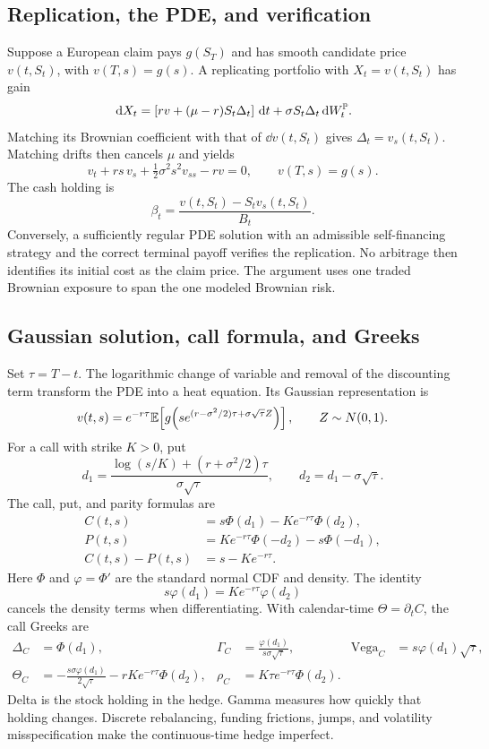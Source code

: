 \subsection{Replication, the PDE, and verification}

Suppose a European claim pays \(g(S_T)\) and has smooth candidate price
\(v(t,S_t)\), with \(v(T,s)=g(s)\). A replicating portfolio with
\(X_t=v(t,S_t)\) has gain
\[
\,\mathrm{d} X_t
=\left[rv+(\mu-r)S_t\Delta_t\right]\,\mathrm{d} t
+\sigma S_t\Delta_t\,\mathrm{d} W_t^{\mathbb{P}}.
\]
Matching its Brownian coefficient with that of \(\dd v(t,S_t)\) gives
\(\Delta_t=v_s(t,S_t)\). Matching drifts then cancels \(\mu\) and yields
\[
\boxed{
v_t+rs\,v_s+\tfrac12\sigma^2s^2v_{ss}-rv=0,
\qquad v(T,s)=g(s).}
\]
The cash holding is
\[
\boxed{\beta_t=\frac{v(t,S_t)-S_tv_s(t,S_t)}{B_t}.}
\]
Conversely, a sufficiently regular PDE solution with an admissible
self-financing strategy and the correct terminal payoff verifies the
replication. No arbitrage then identifies its initial cost as the claim
price. The argument uses one traded Brownian exposure to span the one
modeled Brownian risk.

\subsection{Gaussian solution, call formula, and Greeks}

Set \(\tau=T-t\). The logarithmic change of variable and removal of the
discounting term transform the PDE into a heat equation. Its Gaussian
representation is
\[
v(t,s)=e^{-r\tau}
\mathbb{E}\!\left[
g\!\left(s e^{(r-\sigma^2/2)\tau+\sigma\sqrt{\tau}Z}\right)
\right],
\qquad Z\sim N(0,1).
\]
For a call with strike \(K>0\), put
\[
d_1=\frac{\log(s/K)+(r+\sigma^2/2)\tau}{\sigma\sqrt{\tau}},
\qquad d_2=d_1-\sigma\sqrt{\tau}.
\]
The call, put, and parity formulas are
\[
\boxed{\begin{aligned}
C(t,s)&=s\Phi(d_1)-Ke^{-r\tau}\Phi(d_2),\\
P(t,s)&=Ke^{-r\tau}\Phi(-d_2)-s\Phi(-d_1),\\
C(t,s)-P(t,s)&=s-Ke^{-r\tau}.
\end{aligned}}
\]
Here \(\Phi\) and \(\varphi=\Phi'\) are the standard normal CDF and
density. The identity
\[
\boxed{s\varphi(d_1)=Ke^{-r\tau}\varphi(d_2)}
\]
cancels the density terms when differentiating. With calendar-time
\(\Theta=\partial_tC\), the call Greeks are
\[
\boxed{\begin{aligned}
\Delta_C&=\Phi(d_1),&
\Gamma_C&=\frac{\varphi(d_1)}{s\sigma\sqrt{\tau}},&
\mathrm{Vega}_C&=s\varphi(d_1)\sqrt{\tau},\\
\Theta_C&=-\frac{s\sigma\varphi(d_1)}{2\sqrt{\tau}}
           -rKe^{-r\tau}\Phi(d_2),&
\rho_C&=K\tau e^{-r\tau}\Phi(d_2).
\end{aligned}}
\]
Delta is the stock holding in the hedge. Gamma measures how quickly
that holding changes. Discrete rebalancing, funding frictions, jumps,
and volatility misspecification make the continuous-time hedge
imperfect.

